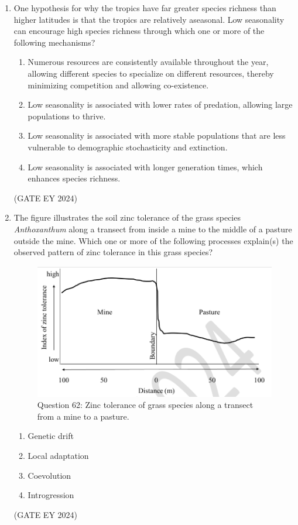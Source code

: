 \documentclass[journal]{IEEEtran}
\begin{document}
\begin{enumerate}
\item One hypothesis for why the tropics have far greater species richness than higher latitudes is that the tropics are relatively aseasonal. Low seasonality can encourage high species richness through which one or more of the following mechanisms?
    \begin{enumerate}
        \item Numerous resources are consistently available throughout the year, allowing different species to specialize on different resources, thereby minimizing competition and allowing co-existence.
        \item Low seasonality is associated with lower rates of predation, allowing large populations to thrive.
        \item Low seasonality is associated with more stable populations that are less vulnerable to demographic stochasticity and extinction.
        \item Low seasonality is associated with longer generation times, which enhances species richness.
    \end{enumerate}
\hfill{(GATE EY 2024)}

\item The figure illustrates the soil zinc tolerance of the grass species \textit{Anthoxanthum} along a transect from inside a mine to the middle of a pasture outside the mine. Which one or more of the following processes explain(s) the observed pattern of zinc tolerance in this grass species?
\begin{figure}[!ht]
    \centering
    \includegraphics[width=0.8\columnwidth]{figs/Q-62.png}
    \caption{Question 62: Zinc tolerance of grass species along a transect from a mine to a pasture.}
    \label{Q.62}
\end{figure}
    \begin{multicols}{2}
    \begin{enumerate}
        \item Genetic drift
        \item Local adaptation
        \item Coevolution
        \item Introgression
    \end{enumerate}
    \end{multicols}
\hfill{(GATE EY 2024)}


\end{enumerate}
\end{document}
